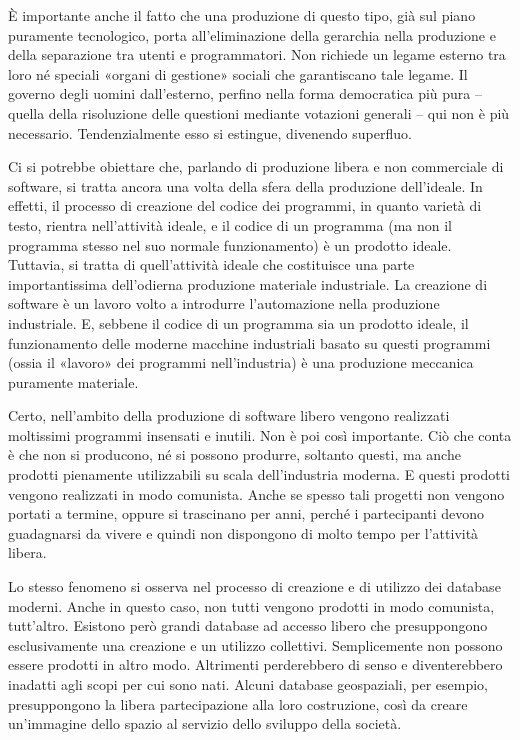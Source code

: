 \documentclass[12pt,a4paper,openany]{book}
\begin{document}
È importante anche il fatto che una produzione di questo tipo, già sul piano puramente tecnologico, porta all'eliminazione della gerarchia nella produzione e della separazione tra utenti e programmatori. Non richiede un legame esterno tra loro né speciali «organi di gestione» sociali che garantiscano tale legame. Il governo degli uomini dall'esterno, perfino nella forma democratica più pura – quella della risoluzione delle questioni mediante votazioni generali – qui non è più necessario. Tendenzialmente esso si estingue, divenendo superfluo.

Ci si potrebbe obiettare che, parlando di produzione libera e non commerciale di software, si tratta ancora una volta della sfera della produzione dell'ideale. In effetti, il processo di creazione del codice dei programmi, in quanto varietà di testo, rientra nell'attività ideale, e il codice di un programma (ma non il programma stesso nel suo normale funzionamento) è un prodotto ideale. Tuttavia, si tratta di quell'attività ideale che costituisce una parte importantissima dell'odierna produzione materiale industriale. La creazione di software è un lavoro volto a introdurre l'automazione nella produzione industriale. E, sebbene il codice di un programma sia un prodotto ideale, il funzionamento delle moderne macchine industriali basato su questi programmi (ossia il «lavoro» dei programmi nell'industria) è una produzione meccanica puramente materiale.

Certo, nell'ambito della produzione di software libero vengono realizzati moltissimi programmi insensati e inutili. Non è poi così importante. Ciò che conta è che non si producono, né si possono produrre, soltanto questi, ma anche prodotti pienamente utilizzabili su scala dell'industria moderna. E questi prodotti vengono realizzati in modo comunista. Anche se spesso tali progetti non vengono portati a termine, oppure si trascinano per anni, perché i partecipanti devono guadagnarsi da vivere e quindi non dispongono di molto tempo per l'attività libera.

Lo stesso fenomeno si osserva nel processo di creazione e di utilizzo dei database moderni. Anche in questo caso, non tutti vengono prodotti in modo comunista, tutt'altro. Esistono però grandi database ad accesso libero che presuppongono esclusivamente una creazione e un utilizzo collettivi. Semplicemente non possono essere prodotti in altro modo. Altrimenti perderebbero di senso e diventerebbero inadatti agli scopi per cui sono nati. Alcuni database geospaziali, per esempio, presuppongono la libera partecipazione alla loro costruzione, così da creare un'immagine dello spazio al servizio dello sviluppo della società.
\end{document}
